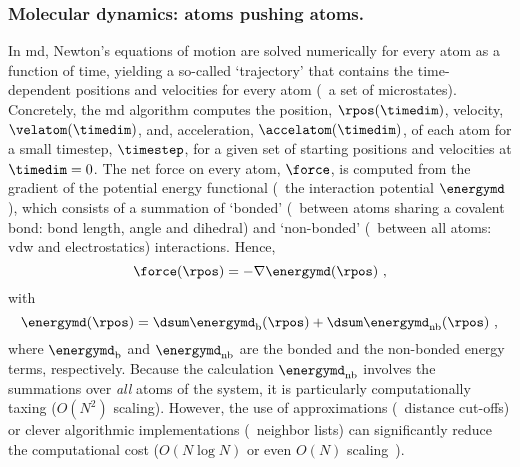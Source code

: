 \subsubsection{Molecular dynamics: atoms pushing atoms.}
%


In \gls{md}, Newton's equations of motion are solved numerically for every atom as a function of time,
yielding a so-called `trajectory' that contains the time-dependent positions and velocities for every atom
(\ie~a set of microstates). Concretely, the \gls{md} algorithm computes the position, $\rpos(\timedim)$,
velocity, $\velatom(\timedim)$, and, acceleration, $\accelatom(\timedim)$, of each atom for a small
timestep\footnotemark, $\timestep$, for a given set of starting positions and velocities at $\timedim = 0$.%
%
%
The net force on every atom, $\force$, is computed from the gradient of the potential energy functional
(\ie~the interaction potential $\energymd$), which consists of a summation of `bonded' (\ie~between atoms
sharing a covalent bond: bond length, angle and dihedral) and `non-bonded' (\ie~between all atoms: \gls{vdw}
and electrostatics) interactions. Hence,
%
\begin{equation}\label{eq:nanopores_md_force}
  \force (\rpos) = - \nabla \energymd (\rpos)
  \text{ ,}
\end{equation}
%
with
%
\begin{equation}\label{eq:nanopores_md_energy}
  \energymd (\rpos) = \dsum \energymd_{\text{b}} (\rpos) + \dsum \energymd_{\text{nb}} (\rpos)
  \text{ ,}
\end{equation}
%
where $\energymd_{\text{b}}$ and $\energymd_{\text{nb}}$ are the bonded and the non-bonded energy terms,
respectively. Because the calculation $\energymd_{\text{nb}}$ involves the summations over \emph{all} atoms of
the system, it is particularly computationally taxing ($O(N^2)$ scaling). However, the use of approximations
(\eg~distance cut-offs) or clever algorithmic implementations (\eg~neighbor lists) can significantly reduce
the computational cost ($O(N\log N)$ or even $O(N)$ scaling~\cite{Eastman-2010}).

